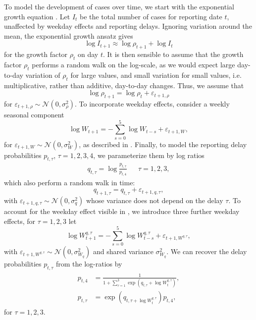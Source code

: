 To model the development of cases over time, we start with the exponential growth equation . Let $I_{t}$ be the total number of cases for reporting date $t$, unaffected by weekday effects and reporting delays. Ignoring variation around the mean, the exponential growth ansatz gives 
$$
    \log I_{t + 1} \approx \log \rho_{t + 1}  + \log I_{t}
$$
for the growth factor $\rho_{t}$ on day $t$. It is then sensible to assume that the growth factor $\rho_{t}$ performs a random walk on the log-scale, as we would expect large day-to-day variation of $\rho_{t}$ for large values, and small variation for small values, i.e. multiplicative, rather than additive, day-to-day changes. Thus, we assume that 
$$
    \log \rho_{t + 1} = \log \rho_{t} + \varepsilon_{t + 1, \rho}
$$
for $\varepsilon_{t + 1,\rho} \sim \mathcal N(0, \sigma^{2}_\rho)$. To incorporate weekday effects, consider a weekly seasonal component 
$$
    \log W_{t + 1} = - \sum_{s = 0}^{5} \log W_{t - s} + \varepsilon_{t + 1, W},
$$
for $\varepsilon_{t + 1, W} \sim \mathcal N(0, \sigma^{2}_{W})$, as described in . Finally, to model the reporting delay probabilities $p_{t,\tau}$, $\tau = 1,2,3,4$, we parameterize them by log ratios
\begin{align*}
    q_{t, \tau} = \log \frac{p_{t,\tau}}{p_{t,4}} && \tau = 1, 2, 3,
\end{align*}
which also perform a random walk in time: 
$$
    q_{t + 1, \tau} = q_{t, \tau} + \varepsilon_{t+1, q, \tau},
$$
with $\varepsilon_{t + 1, q, \tau} \sim \mathcal N(0, \sigma^{2}_{q})$ whose variance does not depend on the delay $\tau$. To account for the weekday effect visible in , we introduce three further weekday effects, for $\tau = 1,  2, 3$ let
$$
    \log W^{q,\tau}_{t + 1} = - \sum_{s = 0}^{5} \log W^{q,\tau}_{t - s} + \varepsilon_{t + 1, W^{q,\tau}},
$$
with $\varepsilon_{t+1, W^{q,\tau}} \sim \mathcal N \left( 0, \sigma^{2}_{W_q} \right)$ and shared variance $\sigma^{2}_{W_{q}}$.
We can recover the delay probabilities $p_{t, \tau}$ from the log-ratios by 
\begin{align}
    \begin{split}
        \label{eq:p-from-log-ratios}
    p_{t, 4} &= \frac{1}{1 + \sum_{\tau = 1}^3 \exp \left( q_{t,\tau} + \log W^{q,\tau}_{t} \right)}, \\
    p_{t, \tau} &= \exp\left( q_{t, \tau + \log W^{q, \tau}_{t}} \right) p_{t, 4},
    \end{split}
\end{align}
for $\tau = 1, 2, 3$.

